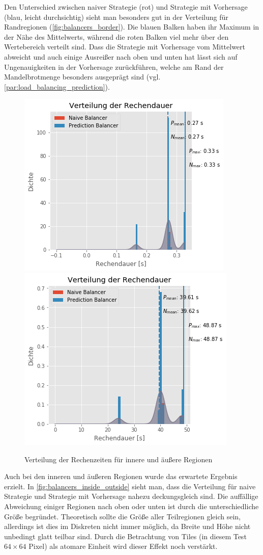 Den Unterschied zwischen naiver Strategie (rot) und Strategie mit Vorhersage (blau, leicht durchsichtig) sieht man besonders gut in der Verteilung für Randregionen (\autoref{fig:balancers_border}).
Die blauen Balken haben ihr Maximum in der Nähe des Mittelwerts, während die roten Balken viel mehr über den Wertebereich verteilt sind.
Dass die Strategie mit Vorhersage vom Mittelwert abweicht und auch einige Ausreißer nach oben und unten hat lässt sich auf Ungenauigkeiten in der Vorhersage zurückführen, welche am Rand der Mandelbrotmenge besonders ausgeprägt sind (vgl. \autoref{par:load_balancing_prediction}).

\begin{figure}
	\centering
	\includegraphics[width=0.45\linewidth]{img/Evaluation/balancers/balancers_outside_slim.png}
	\includegraphics[width=0.45\linewidth]{img/Evaluation/balancers/balancers_inside_slim.png}
	\caption{Verteilung der Rechenzeiten für innere und äußere Regionen}
	\label{fig:balancers_inside_outside}
\end{figure}

Auch bei den inneren und äußeren Regionen wurde das erwartete Ergebnis erzielt.
In \autoref{fig:balancers_inside_outside} sieht man, dass die Verteilung für naive Strategie und Strategie mit Vorhersage nahezu deckungsgleich sind.
Die auffällige Abweichung einiger Regionen nach oben oder unten ist durch die unterschiedliche Größe begründet.
Theoretisch sollte die Größe aller Teilregionen gleich sein, allerdings ist dies im Diskreten nicht immer möglich, da Breite und Höhe nicht unbedingt glatt teilbar sind.
Durch die Betrachtung von Tiles (in diesem Test $64\times64$ Pixel) als atomare Einheit wird dieser Effekt noch verstärkt.

